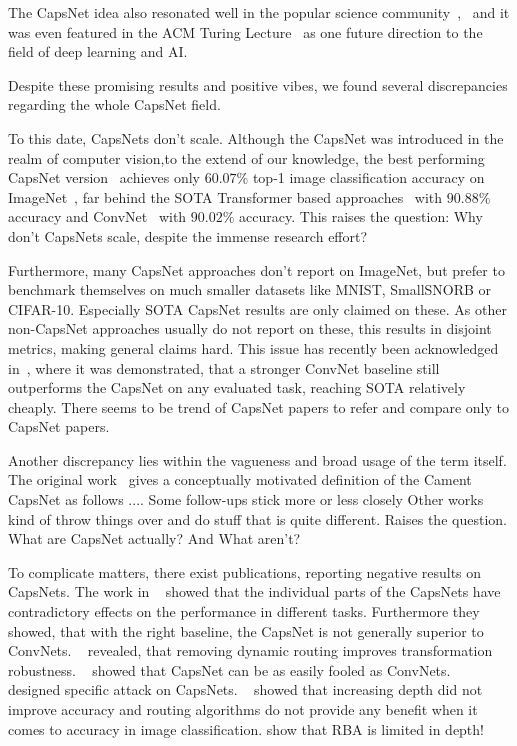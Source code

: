 \documentclass{article}
\begin{document}
The CapsNet idea also resonated well in the popular science community~\cite{book/hawkins2021},~\cite{book/Hiesinger2021} and it was even featured in the ACM Turing Lecture~\cite{comacm/Bengio2021} as one future direction to the field of deep learning and AI.

Despite these promising results and positive vibes, we found several discrepancies regarding the whole CapsNet field.

To this date, CapsNets don't scale. Although the CapsNet was introduced in the realm of computer vision,to the extend of our knowledge, the best performing CapsNet version~\cite{nips/AhmedT19} achieves only $60.07\%$ top-1 image classification accuracy on ImageNet~\cite{data/imagenet}, far behind the SOTA Transformer based approaches~\cite{corr/Wortsman2022} with $90.88\%$ accuracy and ConvNet~\cite{cvpr/Pham2021} with $90.02\%$ accuracy.
This raises the question: Why don't CapsNets scale, despite the immense research effort?

Furthermore, many CapsNet approaches don't report on ImageNet, but prefer to benchmark themselves on much smaller datasets like MNIST, SmallSNORB or CIFAR-10. %
Especially SOTA CapsNet results are only claimed on these. %
As other non-CapsNet approaches usually do not report on these, this results in disjoint metrics, making general claims hard.
This issue has recently been acknowledged in~\cite{cvpr/GuT021}, where it was demonstrated, that a stronger ConvNet baseline still outperforms the CapsNet on any evaluated task, reaching SOTA relatively cheaply.
There seems to be trend of CapsNet papers to refer and compare only to CapsNet papers.

Another discrepancy lies within the vagueness and broad usage of the term itself.
The original work~\cite{nips/SabourFH17} gives a conceptually motivated definition of the Cament CapsNet as follows ....
Some follow-ups stick more or less closely %
Other works kind of throw things over and do stuff that is quite different. %
Raises the question. What are CapsNet actually? And What aren't?

To complicate matters, there exist publications, reporting negative results on CapsNets.
The work in ~\cite{cvpr/GuT021} showed that the individual parts of the CapsNets have contradictory effects on the performance in different tasks. Furthermore they showed, that with the right baseline, the CapsNet is not generally superior to ConvNets.
~\cite{ieee/Gu2020} revealed, that removing dynamic routing improves transformation robustness.
~\cite{corr/michels2019} showed that CapsNet can be as easily fooled as ConvNets.
~\cite{iclr/Gu2021} designed specific attack on CapsNets.
~\cite{acml/PaikKK19} showed that increasing depth did not improve accuracy and routing algorithms do not provide any benefit when it comes to accuracy in image classification.
\cite{prl/PeerSR21} show that RBA is limited in depth!
\end{document}
